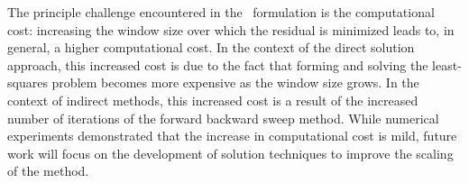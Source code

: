 \documentclass[3p,computermodern,10pt]{elsarticle}
\begin{document}
 
The principle challenge encountered in the \methodAcronym\ formulation is the computational cost: increasing the window size over which the residual is minimized leads to, in general, a higher computational cost. In the context of the direct solution approach, this increased cost is due to the fact that forming and solving the least-squares problem becomes more expensive as the window size grows. In the context of indirect methods, this increased cost is a result of the increased number of iterations of the forward backward sweep method. While numerical experiments demonstrated that the increase in computational cost is mild, future work will focus on the development of solution techniques to improve the scaling of the method.

 


\end{document}
